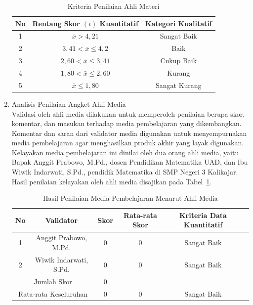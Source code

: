 \documentclass[12pt]{article}
\begin{document}
\begin{enumerate}
    \begin{table}[H]
        \centering
        \caption{Kriteria Penilaian Ahli Materi}
        \begin{tabular}{|c|c|c|}
            \hline
            \textbf{No} & \textbf{Rentang Skor \( (i) \) Kuantitatif} & \textbf{Kategori Kualitatif}\\
            \hline
            1 & \( \bar{x} > 4{,}21 \) & Sangat Baik\\
            2 & \( 3{,}41 < \bar{x} \leq 4{,}2 \) & Baik\\
            3 & \( 2{,}60 < \bar{x} \leq 3{,}41 \) & Cukup Baik\\
            4 & \( 1{,}80 < \bar{x} \leq 2{,}60 \) & Kurang\\
            5 & \( \bar{x} \leq 1{,80} \) & Sangat Kurang\\
            \hline 
        \end{tabular}
    \end{table}

    \item Analisis Penilaian Angket Ahli Media\\
    \hspace*{1cm}Validasi oleh ahli media dilakukan untuk memperoleh penilaian berupa skor, komentar, dan masukan terhadap media pembelajaran yang dikembangkan. Komentar dan saran dari validator media digunakan untuk menyempurnakan media pembelajaran agar menghasilkan produk akhir yang layak digunakan. Kelayakan media pembelajaran ini dinilai oleh dua orang ahli media, yaitu Bapak Anggit Prabowo, M.Pd., dosen Pendidikan Matematika UAD, dan Ibu Wiwik Indarwati, S.Pd., pendidik Matematika di SMP Negeri 3 Kalikajar. Hasil penilaian kelayakan oleh ahli media disajikan pada Tabel~\ref{penilaianmedia}.
    \begin{table}[H]
        \begin{adjustwidth}{-2cm}{-2cm}
            \centering
            \caption{Hasil Penilaian Media Pembelajaran Menurut Ahli Media}
            \label{penilaianmedia}
            \begin{tabular}{|c|c|c|c|c|c|}
                \hline
                \textbf{No} & \textbf{Validator} & \textbf{Skor} & \textbf{Rata-rata Skor} & \textbf{Kriteria Data Kuantitatif}\\
                \hline
                1 & Anggit Prabowo, M.Pd. & 0 & 0 & Sangat Baik\\
                2 & Wiwik Indarwati, S.Pd. & 0 & 0 & Sangat Baik\\
                \hline
                \multicolumn{2}{|c|}{Jumlah Skor} & 0 & & \\
                \hline
                \multicolumn{2}{|c|}{Rata-rata Keseluruhan} & 0 & 0 & Sangat Baik\\
                \hline
            \end{tabular}
        \end{adjustwidth}
    \end{table}


\end{enumerate}
\end{document}
